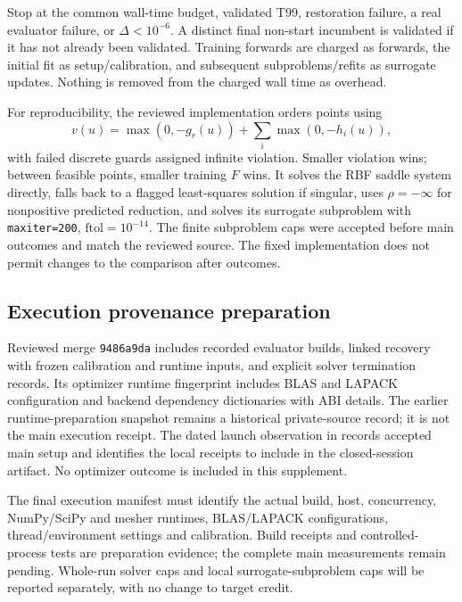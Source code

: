 Stop at the common wall-time budget, validated T99, restoration failure,
a real evaluator failure, or $\Delta<10^{-6}$. A distinct final non-start
incumbent is validated if it has not already been validated. Training
forwards are charged as forwards, the initial fit as setup/calibration,
and subsequent subproblems/refits as surrogate updates. Nothing is removed
from the charged wall time as overhead.

For reproducibility, the reviewed implementation orders points using
\begin{equation}
 v(u)=\max(0,-g_r(u))+\sum_i\max(0,-h_i(u)),
\end{equation}
with failed discrete guards assigned infinite violation. Smaller violation
wins; between feasible points, smaller training $F$ wins. It solves the RBF
saddle system directly, falls back to a flagged least-squares solution if
singular, uses $\rho=-\infty$ for nonpositive predicted reduction, and
solves its surrogate subproblem with
\texttt{maxiter=200}, $\mathrm{ftol}=10^{-14}$. The finite subproblem caps were
accepted before main outcomes and match the reviewed source. The fixed
implementation does not permit changes to the comparison after outcomes.

\subsection{Execution provenance preparation}

Reviewed merge \texttt{9486a9da} includes recorded evaluator builds,
linked recovery with frozen calibration and runtime inputs, and explicit solver
termination records. Its optimizer runtime fingerprint includes BLAS and LAPACK
configuration and backend dependency dictionaries with ABI details. The
earlier runtime-preparation snapshot remains a historical private-source
record; it is not the main execution receipt.
The dated launch observation in  records accepted main
setup and identifies the local receipts to include in the closed-session
artifact. No optimizer outcome is included in this supplement.

The final execution manifest must identify the actual build, host, concurrency,
NumPy/SciPy and mesher runtimes, BLAS/LAPACK configurations, thread/environment
settings and calibration. Build receipts and controlled-process tests are
preparation evidence; the complete main measurements remain pending.
Whole-run solver caps and local surrogate-subproblem caps will be
reported separately, with no change to target credit.

